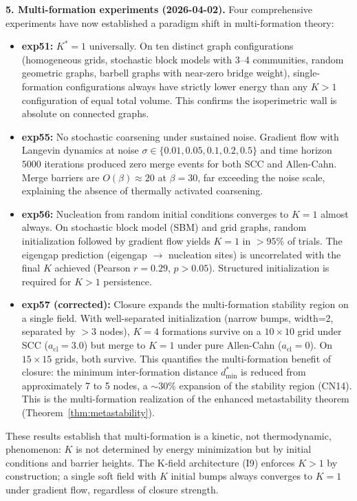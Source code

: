 \documentclass[lettersize,journal]{IEEEtran}
\begin{document}
\textbf{5. Multi-formation experiments (2026-04-02).} Four comprehensive experiments have now established a paradigm shift in multi-formation theory:
\begin{itemize}
\item \textbf{exp51:} $K^* = 1$ universally. On ten distinct graph configurations (homogeneous grids, stochastic block models with 3--4 communities, random geometric graphs, barbell graphs with near-zero bridge weight), single-formation configurations always have strictly lower energy than any $K > 1$ configuration of equal total volume. This confirms the isoperimetric wall is absolute on connected graphs.

\item \textbf{exp55:} No stochastic coarsening under sustained noise. Gradient flow with Langevin dynamics at noise $\sigma \in \{0.01, 0.05, 0.1, 0.2, 0.5\}$ and time horizon $5000$ iterations produced zero merge events for both SCC and Allen-Cahn. Merge barriers are $O(\beta) \approx 20$ at $\beta = 30$, far exceeding the noise scale, explaining the absence of thermally activated coarsening.

\item \textbf{exp56:} Nucleation from random initial conditions converges to $K=1$ almost always. On stochastic block model (SBM) and grid graphs, random initialization followed by gradient flow yields $K=1$ in $>95\%$ of trials. The eigengap prediction (eigengap $\to$ nucleation sites) is uncorrelated with the final $K$ achieved (Pearson $r = 0.29$, $p > 0.05$). Structured initialization is required for $K > 1$ persistence.

\item \textbf{exp57 (corrected):} Closure expands the multi-formation stability region on a single field. With well-separated initialization (narrow bumps, width=2, separated by $>3$ nodes), $K=4$ formations survive on a $10 \times 10$ grid under SCC ($a_{\mathrm{cl}} = 3.0$) but merge to $K=1$ under pure Allen-Cahn ($a_{\mathrm{cl}} = 0$). On $15 \times 15$ grids, both survive. This quantifies the multi-formation benefit of closure: the minimum inter-formation distance $d_{\min}^*$ is reduced from approximately 7 to 5 nodes, a $\sim 30\%$ expansion of the stability region (CN14). This is the multi-formation realization of the enhanced metastability theorem (Theorem~\ref{thm:metastability}).
\end{itemize}

These results establish that multi-formation is a kinetic, not thermodynamic, phenomenon: $K$ is not determined by energy minimization but by initial conditions and barrier heights. The K-field architecture (I9) enforces $K > 1$ by construction; a single soft field with $K$ initial bumps always converges to $K=1$ under gradient flow, regardless of closure strength.
\end{document}
